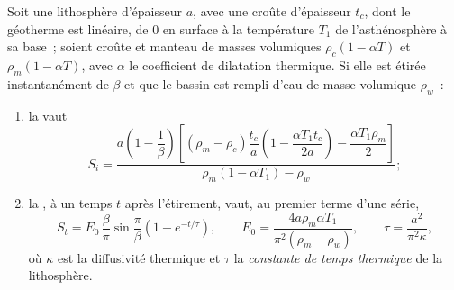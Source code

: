 \begin{proposition}\label{prop:b2:basins-compared:stretching}
Soit une lithosphère d'épaisseur $a$, avec une croûte d'épaisseur $t_c$, dont le géotherme est linéaire, de
$0$ en surface à la température $T_1$ de l'asthénosphère à sa base~; soient croûte et manteau de masses volumiques
$\rho_c(1 - \alpha T)$ et $\rho_m(1 - \alpha T)$, avec $\alpha$ le coefficient de dilatation thermique. Si elle est étirée
instantanément de $\beta$ et que le bassin est rempli
d'eau de masse volumique $\rho_w$~:
\begin{enumerate}
  \item la  vaut
  \[
    S_i = \frac{a\left(1 - \dfrac{1}{\beta}\right)\left[(\rho_m - \rho_c)\dfrac{t_c}{a}
          \left(1 - \dfrac{\alpha T_1 t_c}{2a}\right) - \dfrac{\alpha T_1 \rho_m}{2}\right]}
          {\rho_m(1 - \alpha T_1) - \rho_w};
  \]
  \item la , à un temps $t$ après l'étirement, vaut, au premier terme d'une série,
  \[
    S_t = E_0\,\frac{\beta}{\pi}\sin\frac{\pi}{\beta}\left(1 - e^{-t/\tau}\right),\qquad
    E_0 = \frac{4a\rho_m\alpha T_1}{\pi^2(\rho_m - \rho_w)},\qquad
    \tau = \frac{a^2}{\pi^2\kappa},
  \]
où $\kappa$ est la diffusivité thermique et $\tau$ la \emph{constante de temps
thermique} de la lithosphère.
\end{enumerate}
\end{proposition}

